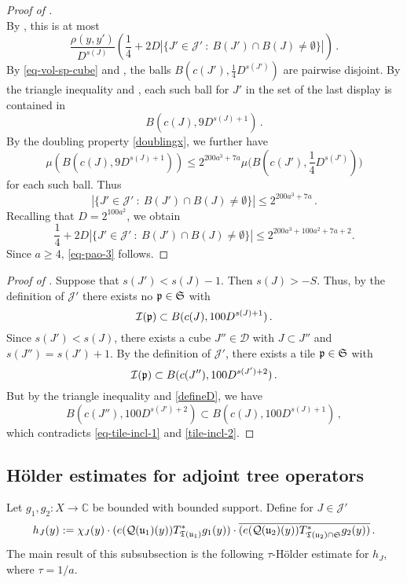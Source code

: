 \begin{proof}[Proof of ]
$$        $$
        By , this is at most
        $$
             \frac{\rho(y,y')}{D^{s(J)}} \left( \frac{1}{4} + 2D |\{J' \in \mathcal{J}' \ : \ B(J') \cap B(J) \ne \emptyset\}|\right)\,.
        $$
        By \eqref{eq-vol-sp-cube} and , the balls $B(c(J'), \frac{1}{4} D^{s(J')})$ are pairwise disjoint. By the triangle inequality and , each such ball for $J'$ in the set of the last display is contained in
        $$
            B(c(J), 9 D^{s(J) + 1})\,.
        $$
        By the doubling property \eqref{doublingx}, we further have
        $$
            \mu(B(c(J), 9 D^{s(J) + 1})) \le 2^{200a^3 + 7a} \mu\Big(B(c(J'), \frac{1}{4}D^{s(J')})\Big)
        $$
        for each such ball.
        Thus
        $$
            |\{J' \in \mathcal{J}' \ : \ B(J') \cap B(J) \ne \emptyset\}| \le 2^{200a^3 + 7a}\,.
        $$
        Recalling that $D=2^{100a^2}$, we obtain
        $$\frac{1}{4} + 2D |\{J' \in \mathcal{J}' \ : \ B(J') \cap B(J) \ne \emptyset\}|\leq 2^{200a^3 + 100a^2 + 7a + 2}.$$
        Since $a\ge 4$, \eqref{eq-pao-3} follows.
    \end{proof}

    \begin{proof}[Proof of ]
        \leanok
        Suppose that $s(J') < s(J) - 1$. Then $s(J) > -S$. Thus, by the definition of $\mathcal{J}'$ there exists no ${\mathfrak p} \in \mathfrak{S}$ with
      \begin{equation}
            \label{eq-tile-incl-1}
            {\mathcal{I}}({\mathfrak p}) \subset B(c(J), 100D^{s(J) + 1})\,.
        \end{equation}
        Since $s(J') < s(J)$, there exists a cube $J'' \in \mathcal{D}$ with $J \subset J''$ and $s(J'') = s(J') + 1$. By the definition of $\mathcal{J}'$, there exists a tile ${\mathfrak p} \in \mathfrak{S}$ with
      \begin{equation}
            \label{tile-incl-2}
            {\mathcal{I}}({\mathfrak p}) \subset B(c(J''), 100 D^{s(J')+2})\,.
        \end{equation}
        But by the triangle inequality and \eqref{defineD}, we have
        $$
            B(c(J''), 100 D^{s(J')+2}) \subset B(c(J), 100D^{s(J) + 1})\,,
        $$
        which contradicts \eqref{eq-tile-incl-1} and \eqref{tile-incl-2}.
    \end{proof}


\subsection{H\"older estimates for adjoint tree operators}
\label{subsubsec-holder-estimates}
    Let $g_1, g_2:X \to \mathbb{C}$ be bounded with bounded support.
    Define for $J \in \mathcal{J}'$
    \begin{equation}
        \label{def-hj}
        h_J(y) := \chi_J(y)\cdot(e({\mathcal{Q}}({\mathfrak u}_1)(y)) T_{{\mathfrak T}({\mathfrak u}_1)}^* g_1(y)) \cdot \overline{(e({\mathcal{Q}}({\mathfrak u}_2)(y)) T_{{\mathfrak T}({\mathfrak u}_2) \cap \mathfrak{S}}^* g_2(y))}\,.
    \end{equation}
    The main result of this subsubsection is the following $\tau$-H\"older estimate for $h_J$, where $\tau = 1/a$.


